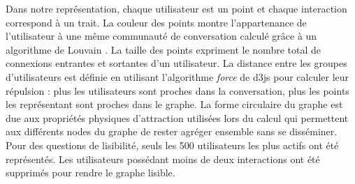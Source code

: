 Dans notre repr\'esentation, chaque utilisateur est un point et chaque interaction correspond \`a un trait. La couleur des points montre l{\textquoteright}appartenance de l{\textquoteright}utilisateur \`a une m\^eme communaut\'e de conversation calcul\'e gr\^ace \`a un algorithme de Louvain \citep{Blondel2008}. La taille des points expriment le nombre total de connexions entrantes et sortantes d{\textquoteright}un utilisateur. La distance entre les groupes d{\textquoteright}utilisateurs est d\'efinie en utilisant l{\textquoteright}algorithme \textit{force} de d3js \citep{Bostock2011} pour calculer leur r\'epulsion : plus les utilisateurs sont proches dans la conversation, plus les points les repr\'esentant sont proches dans le graphe. La forme circulaire du graphe est due aux propri\'et\'es physiques d{\textquoteright}attraction utilis\'ees lors du calcul qui permettent aux diff\'erents nodes du graphe de rester agr\'eger ensemble sans se diss\'eminer. Pour des questions de lisibilit\'e, seuls les 500 utilisateurs les plus actifs ont \'et\'e repr\'esent\'es. Les utilisateurs poss\'edant moins de deux interactions ont \'et\'e supprim\'es pour rendre le graphe lisible. 

